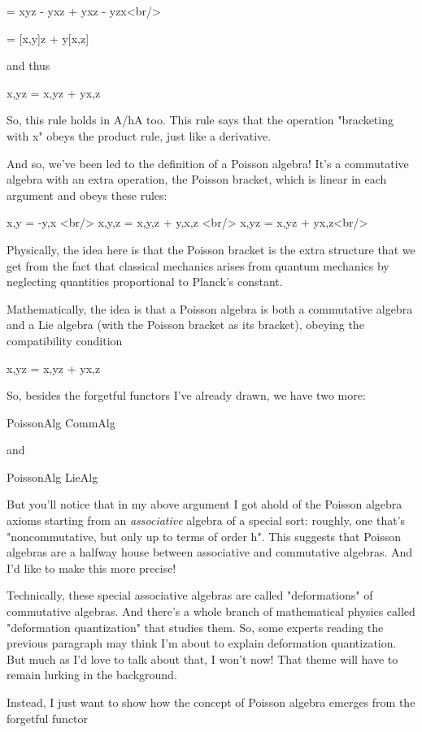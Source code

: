        = xyz - yxz + yxz - yzx<br/>
        
       = [x,y]z + y[x,z]

and thus

{x,yz} = {x,y}z + y{x,z}

So, this rule holds in A/hA too.  This rule says that the operation
"bracketing with x" obeys the product rule, just like a
derivative.

And so, we've been led to the definition of a Poisson algebra!  It's a
commutative algebra with an extra operation, the Poisson bracket,
which is linear in each argument and obeys these rules:

{x,y} = -{y,x}  <br/>
{x,{y,z}} = {{x,y},z} + {y,{x,z}} <br/>
{x,yz} = {x,y}z + y{x,z}<br/>

Physically, the idea here is that the Poisson bracket is the extra
structure that we get from the fact that classical mechanics arises
from quantum mechanics by neglecting quantities proportional to
Planck's constant.

Mathematically, the idea is that a Poisson algebra is both a
commutative algebra and a Lie algebra (with the Poisson bracket as its
bracket), obeying the compatibility condition

{x,yz} = {x,y}z + y{x,z}

So, besides the forgetful functors I've already drawn, we have two
more:

PoissonAlg \to  CommAlg

and 

PoissonAlg \to  LieAlg

But you'll notice that in my above argument I got ahold of the Poisson
algebra axioms starting from an \emph{associative} algebra of a
special sort: roughly, one that's "noncommutative, but only up to
terms of order h".  This suggests that Poisson algebras are a
halfway house between associative and commutative algebras.  And I'd
like to make this more precise!

Technically, these special associative algebras are called
"deformations" of commutative algebras.  And there's a whole
branch of mathematical physics called "deformation
quantization" that studies them.  So, some experts reading the
previous paragraph may think I'm about to explain deformation
quantization.  But much as I'd love to talk about that, I won't now!
That theme will have to remain lurking in the background.

Instead, I just want to show how the concept of Poisson algebra
emerges from the forgetful functor

